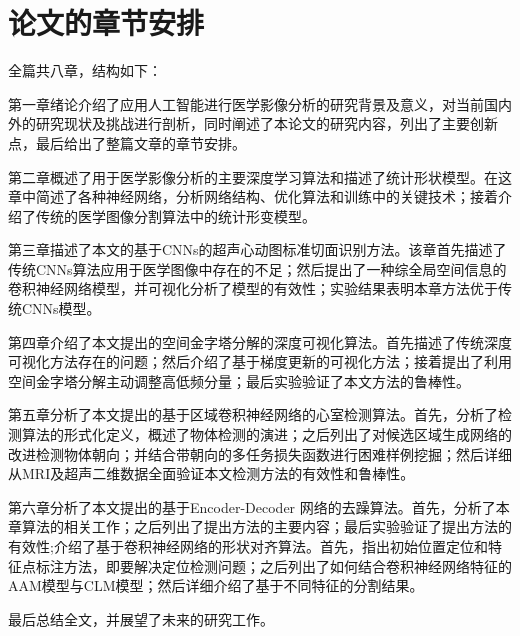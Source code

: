 \section{论文的章节安排}

全篇共八章，结构如下：

第一章绪论介绍了应用人工智能进行医学影像分析的研究背景及意义，对当前国内外的研究现状及挑战进行剖析，同时阐述了本论文的研究内容，列出了主要创新点，最后给出了整篇文章的章节安排。

第二章概述了用于医学影像分析的主要深度学习算法和描述了统计形状模型。在这章中简述了各种神经网络，分析网络结构、优化算法和训练中的关键技术；接着介绍了传统的医学图像分割算法中的统计形变模型。

第三章描述了本文的基于CNNs的超声心动图标准切面识别方法。该章首先描述了传统CNNs算法应用于医学图像中存在的不足；然后提出了一种综全局空间信息的卷积神经网络模型，并可视化分析了模型的有效性；实验结果表明本章方法优于传统CNNs模型。

第四章介绍了本文提出的空间金字塔分解的深度可视化算法。首先描述了传统深度可视化方法存在的问题；然后介绍了基于梯度更新的可视化方法；接着提出了利用空间金字塔分解主动调整高低频分量；最后实验验证了本文方法的鲁棒性。

第五章分析了本文提出的基于区域卷积神经网络的心室检测算法。首先，分析了检测算法的形式化定义，概述了物体检测的演进；之后列出了对候选区域生成网络的改进检测物体朝向；并结合带朝向的多任务损失函数进行困难样例挖掘；然后详细从MRI及超声二维数据全面验证本文检测方法的有效性和鲁棒性。

第六章分析了本文提出的基于Encoder-Decoder 网络的去躁算法。首先，分析了本章算法的相关工作；之后列出了提出方法的主要内容；最后实验验证了提出方法的有效性;介绍了基于卷积神经网络的形状对齐算法。首先，指出初始位置定位和特征点标注方法，即要解决定位检测问题；之后列出了如何结合卷积神经网络特征的AAM模型与CLM模型；然后详细介绍了基于不同特征的分割结果。

最后总结全文，并展望了未来的研究工作。
